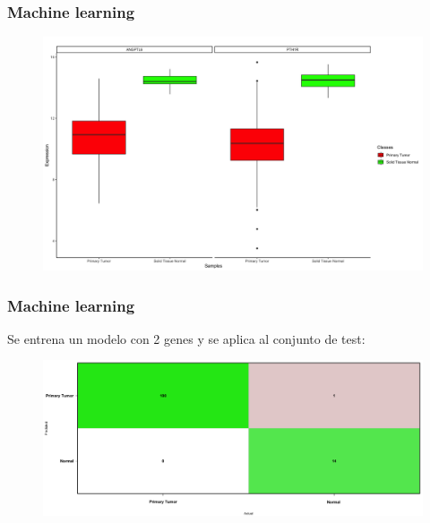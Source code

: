 \documentclass{beamer}
\begin{document}

\begin{frame}\frametitle{Machine learning}
	\begin{figure}
		\centering
		\includegraphics[width=.9\textwidth]{images/16_higado_biclase_43_knn_boxplots_mejor_metodo.png}
	\end{figure}
\end{frame}


\begin{frame}\frametitle{Machine learning}
	Se entrena un modelo con 2 genes y se aplica al conjunto de test:
	\begin{figure}
		\centering
		\includegraphics[width=.9\textwidth]{images/17_higado_biclase_18_svm_matriz_confusion_mejor_metodo.png}
	\end{figure}
\end{frame}

\end{document}
